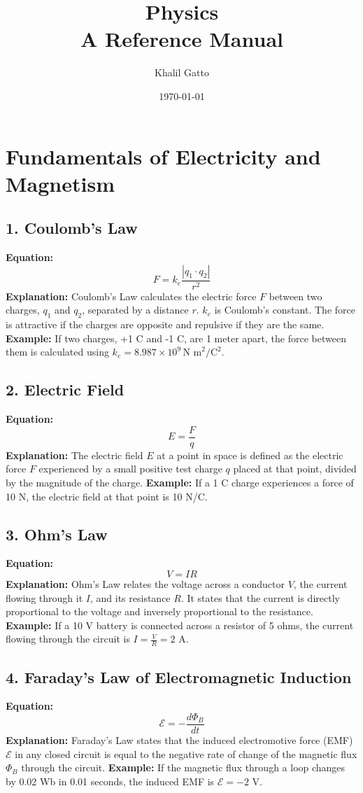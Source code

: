 \documentclass{article}
\title{Physics\\A Reference Manual}
\author{Khalil Gatto}
\date{\today}
\begin{document}
\maketitle


\section*{Fundamentals of Electricity and Magnetism}

\subsection*{1. Coulomb's Law}
\textbf{Equation:} 
\[ F = k_e \frac{{|q_1 \cdot q_2|}}{{r^2}} \]
\textbf{Explanation:} 
Coulomb's Law calculates the electric force \( F \) between two charges, \( q_1 \) and \( q_2 \), separated by a distance \( r \). \( k_e \) is Coulomb's constant. The force is attractive if the charges are opposite and repulsive if they are the same.
\textbf{Example:}
If two charges, +1 C and -1 C, are 1 meter apart, the force between them is calculated using \( k_e = 8.987 \times 10^9 \, \text{N m}^2/\text{C}^2 \).

\subsection*{2. Electric Field}
\textbf{Equation:} 
\[ E = \frac{F}{q} \]
\textbf{Explanation:} 
The electric field \( E \) at a point in space is defined as the electric force \( F \) experienced by a small positive test charge \( q \) placed at that point, divided by the magnitude of the charge.
\textbf{Example:}
If a 1 C charge experiences a force of 10 N, the electric field at that point is 10 N/C.

\subsection*{3. Ohm's Law}
\textbf{Equation:} 
\[ V = IR \]
\textbf{Explanation:} 
Ohm's Law relates the voltage across a conductor \( V \), the current flowing through it \( I \), and its resistance \( R \). It states that the current is directly proportional to the voltage and inversely proportional to the resistance.
\textbf{Example:}
If a 10 V battery is connected across a resistor of 5 ohms, the current flowing through the circuit is \( I = \frac{V}{R} = 2 \) A.

\subsection*{4. Faraday's Law of Electromagnetic Induction}
\textbf{Equation:} 
\[ \mathcal{E} = -\frac{d\Phi_B}{dt} \]
\textbf{Explanation:} 
Faraday's Law states that the induced electromotive force (EMF) \( \mathcal{E} \) in any closed circuit is equal to the negative rate of change of the magnetic flux \( \Phi_B \) through the circuit.
\textbf{Example:}
If the magnetic flux through a loop changes by 0.02 Wb in 0.01 seconds, the induced EMF is \( \mathcal{E} = -2 \) V.
\end{document}
